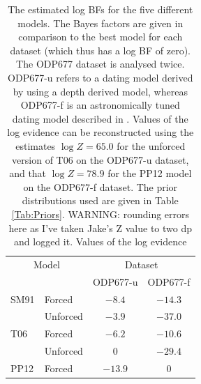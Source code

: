 \documentclass[a4paper,12pt]{article}
\begin{document}
\clearpage


\begin{table}
\begin{center}
\begin{tabular}{ l l  c c  }
\toprule
\multicolumn{2}{c}{Model} & \multicolumn{2}{c}{Dataset} \\
& & ODP677-u & ODP677-f\\
\midrule
SM91 & Forced &  $-8.4$ & $-14.3$ \\
 & Unforced &  $-3.9$ & $-37.0$ \\
T06 & Forced & $-6.2$ & $ -10.6$  \\
 & Unforced &  $0$ & $-29.4$  \\ 
PP12 & Forced & $-13.9$ & $0$  \\
\bottomrule
\end{tabular}
\caption{
The estimated log BFs for the five different models. The Bayes factors are given in comparison to the best model for each dataset (which thus has a log BF of zero).
The ODP677 dataset is analysed twice. ODP677-u refers to a dating model derived by \cite{Huybers2007} using a depth derived model, whereas ODP677-f is an astronomically tuned dating model described in \cite{Lisiecki2005}.
Values of the log evidence can be reconstructed using the estimates  $\log Z=65.0$ for the unforced version of T06 on the ODP677-u dataset, and that $\log Z = 78.9$ for the PP12 model on the ODP677-f dataset. The prior distributions used are given in Table \ref{Tab:Priors}.
WARNING: rounding errors here as I've taken Jake's Z value to two dp and logged it. Values of the log evidence
}
\label{Tab:EvidenceODP}
\end{center}
\end{table}
\end{document}
